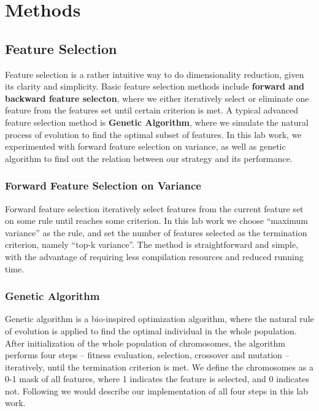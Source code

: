 \documentclass[journal]{IEEEtran}
\begin{document}



\section{Methods}
\label{sec:2}
\subsection{Feature Selection}
Feature selection is a rather intuitive way to do dimensionality reduction, given its clarity and simplicity. Basic feature selection methods include \textbf{forward and backward feature selecton}, where we either iteratively select or eliminate one feature from the features set until certain criterion is met. A typical advanced feature selection method is \textbf{Genetic Algorithm}, where we simulate the natural process of evolution to find the optimal subset of features. In this lab work, we experimented with forward feature selection on variance, as well as genetic algorithm to find out the relation between our strategy and its performance.
~\\
\subsubsection{Forward Feature Selection on Variance}
Forward feature selection iteratively select features from the current feature set on some rule until reaches some criterion. In this lab work we choose ``maximum variance'' as the rule, and set the number of features selected as the termination criterion, namely ``top-k variance''. The method is straightforward and simple, with the advantage of requiring less compilation resources and reduced running time.

\subsubsection{Genetic Algorithm}
Genetic algorithm is a bio-inspired optimization algorithm, where the natural rule of evolution is applied to find the optimal individual in the whole population. After initialization of the whole population of chromosomes, the algorithm performs four steps -- fitness evaluation, selection, crossover and mutation -- iteratively, until the termination criterion is met. We define the chromosomes as a 0-1 mask of all features, where 1 indicates the feature is selected, and 0 indicates not. Following we would describe our implementation of all four steps in this lab work.
\end{document}
